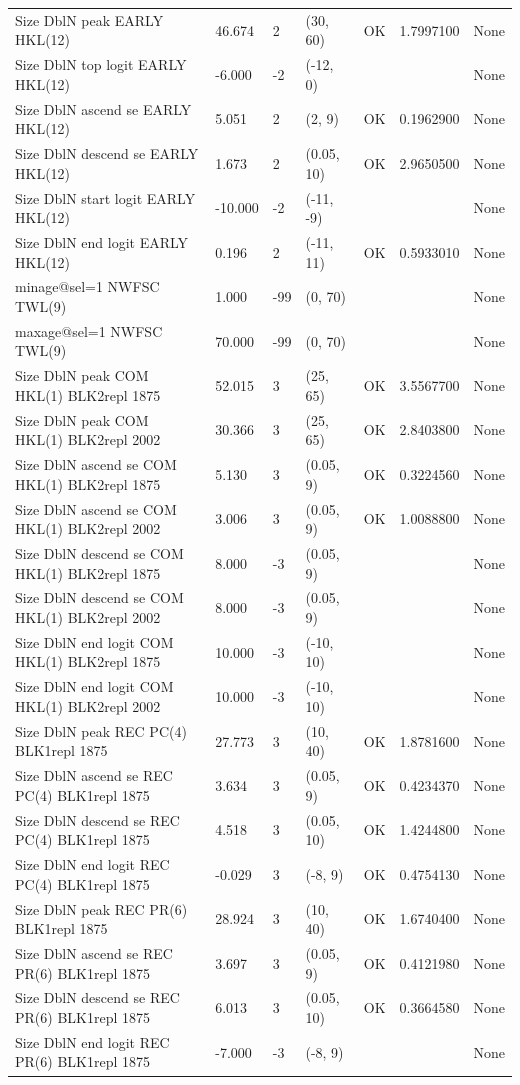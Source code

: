 \documentclass[11pt,
  english,
]{article}
\begin{document}
\begin{landscape}
\begin{longtable}[t]{lllllll}
Size DblN peak EARLY HKL(12) & 46.674 & 2 & (30, 60) & OK & 1.7997100 & None\\
Size DblN top logit EARLY HKL(12) & -6.000 & -2 & (-12, 0) &  &  & None\\
Size DblN ascend se EARLY HKL(12) & 5.051 & 2 & (2, 9) & OK & 0.1962900 & None\\
Size DblN descend se EARLY HKL(12) & 1.673 & 2 & (0.05, 10) & OK & 2.9650500 & None\\
\addlinespace
Size DblN start logit EARLY HKL(12) & -10.000 & -2 & (-11, -9) &  &  & None\\
Size DblN end logit EARLY HKL(12) & 0.196 & 2 & (-11, 11) & OK & 0.5933010 & None\\
minage@sel=1 NWFSC TWL(9) & 1.000 & -99 & (0, 70) &  &  & None\\
maxage@sel=1 NWFSC TWL(9) & 70.000 & -99 & (0, 70) &  &  & None\\
Size DblN peak COM HKL(1) BLK2repl 1875 & 52.015 & 3 & (25, 65) & OK & 3.5567700 & None\\
\addlinespace
Size DblN peak COM HKL(1) BLK2repl 2002 & 30.366 & 3 & (25, 65) & OK & 2.8403800 & None\\
Size DblN ascend se COM HKL(1) BLK2repl 1875 & 5.130 & 3 & (0.05, 9) & OK & 0.3224560 & None\\
Size DblN ascend se COM HKL(1) BLK2repl 2002 & 3.006 & 3 & (0.05, 9) & OK & 1.0088800 & None\\
Size DblN descend se COM HKL(1) BLK2repl 1875 & 8.000 & -3 & (0.05, 9) &  &  & None\\
Size DblN descend se COM HKL(1) BLK2repl 2002 & 8.000 & -3 & (0.05, 9) &  &  & None\\
\addlinespace
Size DblN end logit COM HKL(1) BLK2repl 1875 & 10.000 & -3 & (-10, 10) &  &  & None\\
Size DblN end logit COM HKL(1) BLK2repl 2002 & 10.000 & -3 & (-10, 10) &  &  & None\\
Size DblN peak REC PC(4) BLK1repl 1875 & 27.773 & 3 & (10, 40) & OK & 1.8781600 & None\\
Size DblN ascend se REC PC(4) BLK1repl 1875 & 3.634 & 3 & (0.05, 9) & OK & 0.4234370 & None\\
Size DblN descend se REC PC(4) BLK1repl 1875 & 4.518 & 3 & (0.05, 10) & OK & 1.4244800 & None\\
\addlinespace
Size DblN end logit REC PC(4) BLK1repl 1875 & -0.029 & 3 & (-8, 9) & OK & 0.4754130 & None\\
Size DblN peak REC PR(6) BLK1repl 1875 & 28.924 & 3 & (10, 40) & OK & 1.6740400 & None\\
Size DblN ascend se REC PR(6) BLK1repl 1875 & 3.697 & 3 & (0.05, 9) & OK & 0.4121980 & None\\
Size DblN descend se REC PR(6) BLK1repl 1875 & 6.013 & 3 & (0.05, 10) & OK & 0.3664580 & None\\
Size DblN end logit REC PR(6) BLK1repl 1875 & -7.000 & -3 & (-8, 9) &  &  & None\\*
\end{longtable}
\leavevmode\tagmcend\tagstructend\par
\endgroup{}
\end{landscape}
\end{document}
